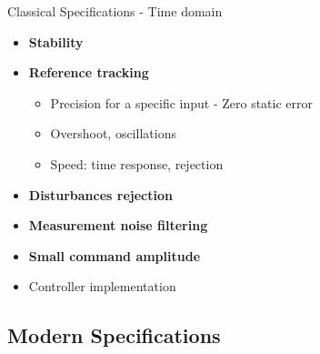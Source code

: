 \documentclass[../main/main.tex]{subfiles}
\begin{document}
\begin{frame}{Classical Specifications - Time domain}
  \begin{itemize}
  \item \textbf{Stability} 
  \item \textbf{Reference tracking} 
    \begin{itemize}
    \item Precision for a specific input - Zero static error
    \item Overshoot, oscillations
    \item Speed: time response, rejection
    \end{itemize}
  \item \textbf{Disturbances rejection} 
  \item \textbf{Measurement noise filtering} 
  \item \textbf{Small command amplitude} 
  \item Controller implementation
  \end{itemize}
\end{frame}

\subsection{Modern Specifications}
\end{document}
